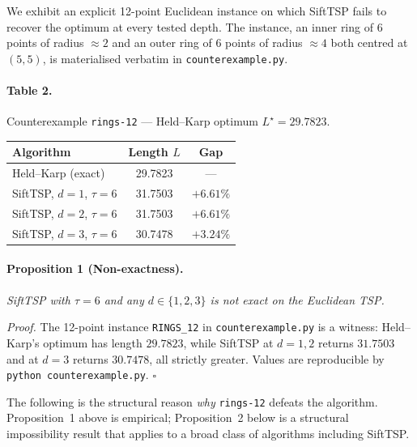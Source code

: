 \documentclass[11pt,a4paper]{article}
\begin{document}
We exhibit an explicit 12-point Euclidean instance on which SiftTSP
fails to recover the optimum at every tested depth. The instance, an
inner ring of 6 points of radius $\approx 2$ and an outer ring of 6
points of radius $\approx 4$ both centred at $(5,5)$, is materialised
verbatim in \texttt{counterexample.py}.

\paragraph{Table 2.} Counterexample \texttt{rings-12} --- Held--Karp
optimum $L^{\star} = 29.7823$.

\begin{center}
\begin{tabular}{lcc}
\toprule
Algorithm & Length $L$ & Gap \\
\midrule
Held--Karp (exact)            & 29.7823 & --- \\
SiftTSP, $d=1$, $\tau=6$      & 31.7503 & $+6.61\%$ \\
SiftTSP, $d=2$, $\tau=6$      & 31.7503 & $+6.61\%$ \\
SiftTSP, $d=3$, $\tau=6$      & 30.7478 & $+3.24\%$ \\
\bottomrule
\end{tabular}
\end{center}

\paragraph{Proposition 1 (Non-exactness).} \textit{SiftTSP with
$\tau = 6$ and any $d \in \{1, 2, 3\}$ is not exact on the Euclidean
TSP.}

\textit{Proof.} The 12-point instance \texttt{RINGS\_12} in
\texttt{counterexample.py} is a witness: Held--Karp's optimum has
length $29.7823$, while SiftTSP at $d=1,2$ returns $31.7503$ and at
$d=3$ returns $30.7478$, all strictly greater. Values are reproducible
by \texttt{python counterexample.py}. $\square$

The following is the structural reason \emph{why} \texttt{rings-12}
defeats the algorithm. Proposition~1 above is empirical; Proposition~2
below is a structural impossibility result that applies to a broad
class of algorithms including SiftTSP.
\end{document}
